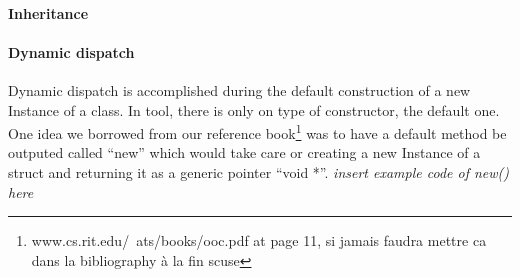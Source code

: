 \paragraph{Inheritance}
\break

\paragraph{Dynamic dispatch}
Dynamic dispatch is accomplished during the default construction of a new Instance of a class. In tool, there is only on type of constructor, the default one. One idea we borrowed from our reference book\footnote{www.cs.rit.edu/~ats/books/ooc.pdf at page 11, si jamais faudra mettre ca dans la bibliography à la fin scuse} was to have a default method be outputed called ``new'' which would take care or creating a new Instance of a struct and returning it as a generic pointer ``void *''. \textit{insert example code of new() here}

